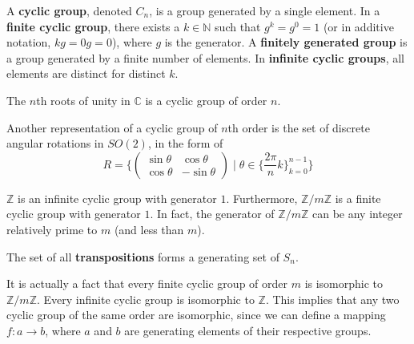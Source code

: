   \begin{definition}
    A \textbf{cyclic group}, denoted $C_{n}$, is a group generated by a single element. In a \textbf{finite cyclic group}, there exists a $k \in \mathbb{N}$ such that $g^{k} = g^{0} = 1$ (or in additive notation, $kg = 0g = 0$), where $g$ is the generator. A \textbf{finitely generated group} is a group generated by a finite number of elements. In \textbf{infinite cyclic groups}, all elements are distinct for distinct $k$. 
  \end{definition}

  \begin{example}
    The $n$th roots of unity in $\mathbb{C}$ is a cyclic group of order $n$. 
  \end{example}

  \begin{example}
    Another representation of a cyclic group of $n$th order is the set of discrete angular rotations in $SO(2)$, in the form of 
    \begin{equation}
      R =  \bigg\{ \begin{pmatrix}
      \sin{\theta} & \cos{\theta} \\
      \cos{\theta} & -\sin{\theta}
      \end{pmatrix}\; \bigg| \; \theta \in \Big\{\frac{2 \pi}{n} k\Big\}_{k = 0}^{n-1} \bigg\}
    \end{equation}
  \end{example}

  \begin{example}
    $\mathbb{Z}$ is an infinite cyclic group with generator $1$. Furthermore, $\mathbb{Z}/m\mathbb{Z}$ is a finite cyclic group with generator $1$. In fact, the generator of $\mathbb{Z}/m\mathbb{Z}$ can be any integer relatively prime to $m$ (and less than $m$). 
  \end{example}

  \begin{theorem}[Transpositions]
    The set of all \textbf{transpositions} forms a generating set of $S_{n}$. 
  \end{theorem}

  It is actually a fact that every finite cyclic group of order $m$ is isomorphic to $\mathbb{Z}/m\mathbb{Z}$. Every infinite cyclic group is isomorphic to $\mathbb{Z}$. This implies that any two cyclic group of the same order are isomorphic, since we can define a mapping $f:a\longrightarrow b$, where $a$ and $b$ are generating elements of their respective groups. 

